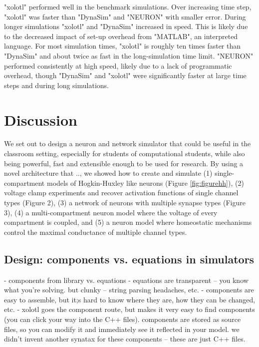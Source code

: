 \documentclass{frontiersSCNS} %
\begin{document}
"xolotl" performed well in the benchmark simulations. Over increasing time step, "xolotl" was faster than "DynaSim" and "NEURON" with smaller error. During longer simulations "xolotl" and "DynaSim" increased in speed. This is likely due to the decreased impact of set-up overhead from "MATLAB", an interpreted language. For most simulation times, "xolotl" is roughly ten times faster than "DynaSim" and about twice as fast in the long-simulation time limit. "NEURON" performed consistently at high speed, likely due to a lack of programmatic overhead, though "DynaSim" and "xolotl" were significantly faster at large time steps and during long simulations.

%
%
%
%
%
%

\section{Discussion}
\label{discussion}

We set out to design a neuron and network simulator that could be useful in the classroom setting, especially for students of computational students, while also being powerful, fast and extensible enough to be used for research. By using a novel architecture that .., we showed how to create and simulate (1) single-compartment models of Hogkin-Huxley like neurons (Figure \ref{fig:figurehh}), (2) voltage clamp experiments and recover activation functions of single channel types (Figure 2), (3) a network of neurons with multiple synapse types (Figure 3), (4) a multi-compartment neuron model where the voltage of every compartment is coupled, and (5) a neuron model where homeostatic mechanisms control the maximal conductance of multiple channel types.


\subsection{Design: components vs. equations in simulators }

- components from library vs. equations
- equations are transparent -- you know what you're solving. but clunky -- string parsing headaches, etc.
- components are easy to assemble, but it;s hard to know where they are, how they can be changed, etc.
- xolotl goes the component route, but makes it very easy to find components (you can click your way into the C++ files). components are stored as source files, so you can modify it and immediately see it reflected in your model. we didn't invent another synatax for these components -- these are just C++ files.
\end{document}
